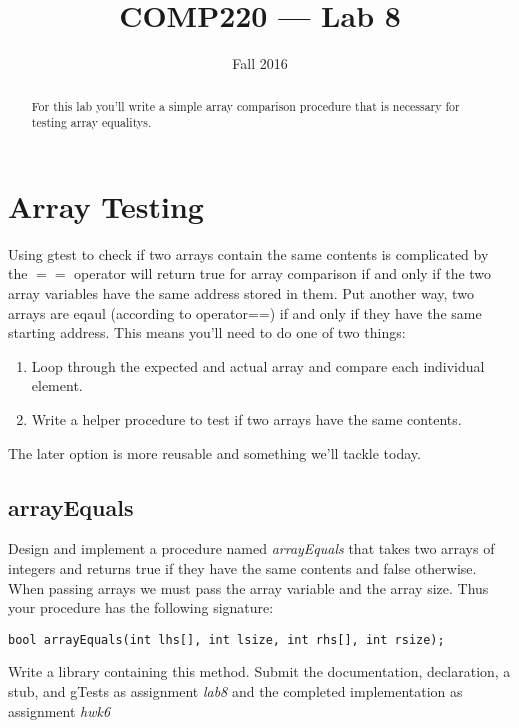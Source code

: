 \documentclass[10pt]{article}
\title{COMP220 --- Lab 8}
\author{ }
\date{Fall 2016}
\begin{document}
\maketitle
\thispagestyle{empty}

\begin{abstract}
For this lab you'll write a simple array comparison procedure that is necessary for testing array equalitys. 
\end{abstract}


\section*{Array Testing}

Using gtest to check if two arrays contain the same contents is complicated by the $==$ operator will return true for array comparison if and only if the two array variables have the same address stored in them. Put another way, two arrays are eqaul (according to operator==) if and only if they have the same starting address. This means you'll need to do one of two things:
\begin{enumerate}
\item Loop through the expected and actual array and compare each individual element.
\item Write a helper procedure to test if two arrays have the same contents. 
\end{enumerate}

The later option is more reusable and something we'll tackle today. 

\subsection*{arrayEquals}

Design and implement a procedure named \textit{arrayEquals} that takes two arrays of integers and returns true if they have the same contents and false otherwise. When passing arrays we must pass the array variable and the array size.  Thus your procedure has the following signature:

\begin{lstlisting}
bool arrayEquals(int lhs[], int lsize, int rhs[], int rsize);
\end{lstlisting}

Write a library containing this method. Submit the documentation, declaration, a stub, and gTests as assignment \textit{lab8} and the completed implementation as assignment \textit{hwk6}
\end{document}
